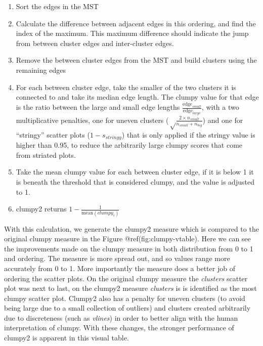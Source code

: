 \begin{enumerate}
\def\labelenumi{\arabic{enumi}.}
\tightlist
\item
  Sort the edges in the MST
\item
  Calculate the difference between adjacent edges in this ordering, and
  find the index of the maximum. This maximum difference should indicate
  the jump from between cluster edges and inter-cluster edges.
\item
  Remove the between cluster edges from the MST and build clusters using
  the remaining edges
\item
  For each between cluster edge, take the smaller of the two clusters it
  is connected to and take its median edge length. The clumpy value for
  that edge is the ratio between the large and small edge lengths
  \(\frac{\mbox{edge}_{small}}{\mbox{edge}_{large}}\), with a two
  multiplicative penalties, one for uneven clusters
  (\(\sqrt\frac{2\times n_{small}}{n_{small}+n_{big}}\)) and one for
  ``stringy'' scatter plots (\(1-s_{stringy}\)) that is only applied if
  the stringy value is higher than 0.95, to reduce the arbitrarily large
  clumpy scores that come from striated plots.
\item
  Take the mean clumpy value for each between cluster edge, if it is
  below 1 it is beneath the threshold that is considered clumpy, and the
  value is adjusted to 1.
\item
  clumpy2 returns \(1-\frac{1}{\mbox{mean}(clumpy_i)}\)
\end{enumerate}

With this calculation, we generate the clumpy2 measure which is compared
to the original clumpy measure in the Figure @ref(fig:clumpy-vtable).
Here we can see the improvements made on the clumpy measure in both
distribution from 0 to 1 and ordering. The measure is more spread out,
and so values range more accurately from 0 to 1. More importantly the
measure does a better job of ordering the scatter plots. On the original
clumpy measure the \emph{clusters} scatter plot was next to last, on the
clumpy2 measure \emph{clusters} is is identified as the most clumpy
scatter plot. Clumpy2 also has a penalty for uneven clusters (to avoid
being large due to a small collection of outliers) and clusters created
arbitrarily due to discreteness (such as \emph{vlines}) in order to
better align with the human interpretation of clumpy. With these
changes, the stronger performance of clumpy2 is apparent in this visual
table.

